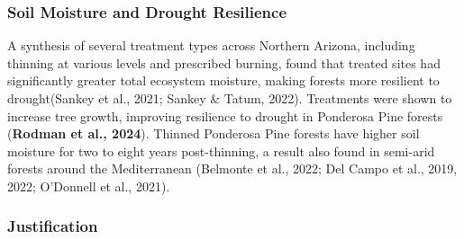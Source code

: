 \documentclass[
]{agujournal2019}
\begin{document}
\subsubsection{Soil Moisture and Drought
Resilience}\label{soil-moisture-and-drought-resilience}

A synthesis of several treatment types across Northern Arizona,
including thinning at various levels and prescribed burning, found that
treated sites had significantly greater total ecosystem moisture, making
forests more resilient to drought(Sankey et al., 2021; Sankey \& Tatum,
2022). Treatments were shown to increase tree growth, improving
resilience to drought in Ponderosa Pine forests (\textbf{Rodman et al.,
2024}). Thinned Ponderosa Pine forests have higher soil moisture for two
to eight years post-thinning, a result also found in semi-arid forests
around the Mediterranean (Belmonte et al., 2022; Del Campo et al., 2019,
2022; O'Donnell et al., 2021).

\subsubsection{Justification}\label{justification}
\end{document}
